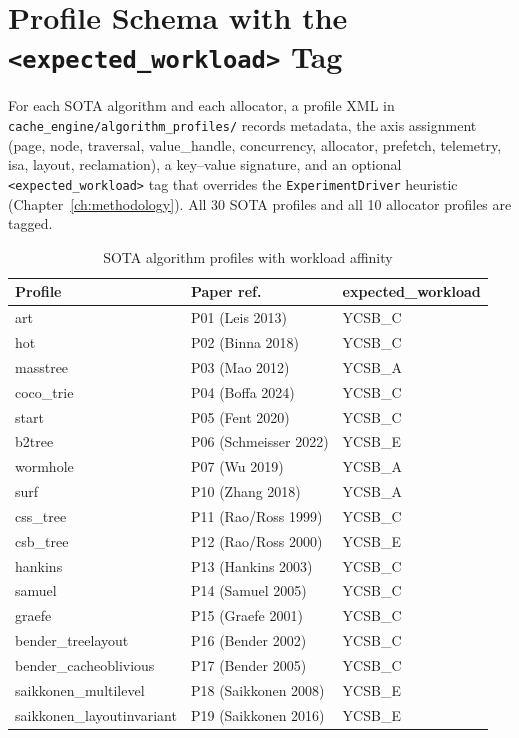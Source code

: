 \section{Profile Schema with the \texorpdfstring{\texttt{<expected\_workload>}}{expected\_workload} Tag}\label{sec:profile-schema}

For each SOTA algorithm and each allocator, a profile XML in
\texttt{cache\_engine/algorithm\_profiles/} records metadata, the axis assignment (page,
node, traversal, value\_handle, concurrency, allocator, prefetch, telemetry, isa, layout,
reclamation), a key--value signature, and an optional \texttt{<expected\_workload>} tag
that overrides the \texttt{ExperimentDriver} heuristic (Chapter~\ref{ch:methodology}). All
30 SOTA profiles and all 10 allocator profiles are tagged.

\begin{table}[!htbp]
\caption{SOTA algorithm profiles with workload affinity}\label{tab:sota-profiles}
\centering\small
\begin{tabular}{lll}
\toprule
\textbf{Profile} & \textbf{Paper ref.} & \textbf{expected\_workload} \\
\midrule
art & P01 (Leis 2013) & YCSB\_C \\
hot & P02 (Binna 2018) & YCSB\_C \\
masstree & P03 (Mao 2012) & YCSB\_A \\
coco\_trie & P04 (Boffa 2024) & YCSB\_C \\
start & P05 (Fent 2020) & YCSB\_C \\
b2tree & P06 (Schmeisser 2022) & YCSB\_E \\
wormhole & P07 (Wu 2019) & YCSB\_A \\
surf & P10 (Zhang 2018) & YCSB\_A \\
css\_tree & P11 (Rao/Ross 1999) & YCSB\_C \\
csb\_tree & P12 (Rao/Ross 2000) & YCSB\_E \\
hankins & P13 (Hankins 2003) & YCSB\_C \\
samuel & P14 (Samuel 2005) & YCSB\_C \\
graefe & P15 (Graefe 2001) & YCSB\_C \\
bender\_treelayout & P16 (Bender 2002) & YCSB\_C \\
bender\_cacheoblivious & P17 (Bender 2005) & YCSB\_C \\
saikkonen\_multilevel & P18 (Saikkonen 2008) & YCSB\_E \\
saikkonen\_layoutinvariant & P19 (Saikkonen 2016) & YCSB\_E \\

\end{tabular}
\end{table}
